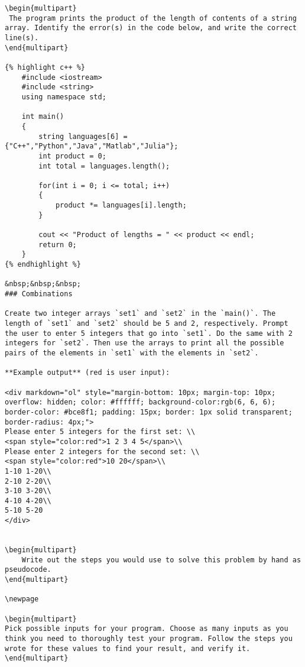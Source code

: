 \begin{problem}
\begin{verbatim}
\begin{multipart}
 The program prints the product of the length of contents of a string array. Identify the error(s) in the code below, and write the correct line(s).
\end{multipart}

{% highlight c++ %}
    #include <iostream>
    #include <string>
    using namespace std;
    
    int main()
    {
        string languages[6] = {"C++","Python","Java","Matlab","Julia"};
        int product = 0;
        int total = languages.length();
    
        for(int i = 0; i <= total; i++)
        {
            product *= languages[i].length;
        }
    
        cout << "Product of lengths = " << product << endl;
        return 0;
    }
{% endhighlight %}

&nbsp;&nbsp;&nbsp;
### Combinations

Create two integer arrays `set1` and `set2` in the `main()`. The length of `set1` and `set2` should be 5 and 2, respectively. Prompt the user to enter 5 integers that go into `set1`. Do the same with 2 integers for `set2`. Then use the arrays to print all the possible pairs of the elements in `set1` with the elements in `set2`.

**Example output** (red is user input):

<div markdown="ol" style="margin-bottom: 10px; margin-top: 10px; overflow: hidden; color: #ffffff; background-color:rgb(6, 6, 6); border-color: #bce8f1; padding: 15px; border: 1px solid transparent; border-radius: 4px;">
Please enter 5 integers for the first set: \\
<span style="color:red">1 2 3 4 5</span>\\
Please enter 2 integers for the second set: \\
<span style="color:red">10 20</span>\\
1-10 1-20\\
2-10 2-20\\
3-10 3-20\\
4-10 4-20\\
5-10 5-20
</div>


\begin{multipart}
    Write out the steps you would use to solve this problem by hand as pseudocode. 
\end{multipart}

\newpage

\begin{multipart}
Pick possible inputs for your program. Choose as many inputs as you think you need to thoroughly test your program. Follow the steps you wrote for these values to find your result, and verify it.
\end{multipart}


\end{verbatim}
\end{problem}
